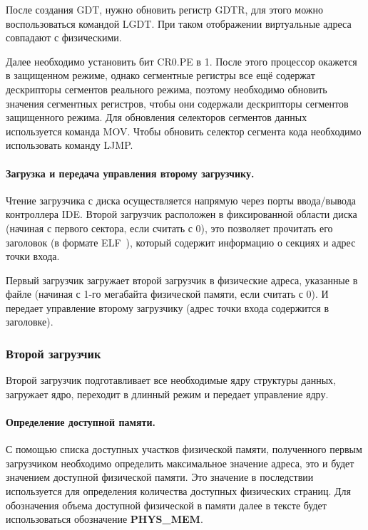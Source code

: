 После создания GDT, нужно обновить регистр GDTR, для этого можно воспользоваться командой LGDT.
При таком отображении виртуальные адреса совпадают с физическими.

Далее необходимо установить бит CR0.PE в 1. После этого процессор окажется в защищенном режиме,
однако сегментные регистры все ещё содержат дескрипторы сегментов реального режима, поэтому необходимо
обновить значения сегментных регистров, чтобы они содержали дескрипторы сегментов защищенного
режима. Для обновления селекторов сегментов данных используется команда MOV. Чтобы обновить селектор
сегмента кода необходимо использовать команду LJMP.

\paragraph{Загрузка и передача управления второму загрузчику.} Чтение загрузчика с диска
осуществляется напрямую через порты ввода/вывода контроллера IDE. Второй загрузчик
расположен в фиксированной области диска (начиная с первого сектора, если считать с 0), это
позволяет прочитать его заголовок (в формате ELF~\cite{elf}), который содержит информацию о
секциях и адрес точки входа.

Первый загрузчик загружает второй загрузчик в физические адреса, указанные в файле
(начиная с 1-го мегабайта физической памяти, если считать с 0). И передает управление
второму загрузчику (адрес точки входа содержится в заголовке).


\subsubsection*{Второй загрузчик}
Второй загрузчик подготавливает все необходимые ядру структуры данных, загружает ядро,
переходит в длинный режим и передает управление ядру.

\paragraph{Определение доступной памяти.} С помощью списка доступных участков физической
памяти, полученного первым загрузчиком необходимо определить максимальное значение адреса,
это и будет значением доступной физической памяти. Это значение в последствии используется
для определения количества доступных физических страниц. Для обозначения объема доступной
физической в памяти далее в тексте будет использоваться обозначение \textbf{PHYS\_MEM}.

